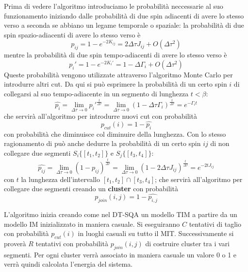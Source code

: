 Prima di vedere l'algoritmo introduciamo le probabilità neccessarie al suo funzionamento iniziando dalle probabilità di due spin adiacenti di avere lo stesso verso a seconda se abbiano un legame temporale o spaziale:
la probabilità di due spin spazio-adiacenti di avere lo stesso verso è
$$p_{ij} = 1 - e^{-2K_{ij}} = 2\Delta \tau J_{ij} + O(\Delta \tau^2)$$
mentre la probabilità di due spin tempo-adiacenti di avere lo stesso verso è
$$p_i' = 1 - e^{-2K_{i}'} = 1 - \Delta \Gamma_{i} + O(\Delta \tau^2)$$
Queste probabilità vengono utilizzate attraverso l'algoritmo Monte Carlo per introdurre altri cut.
Da qui si può esprimere la probabilità di un certo spin $i$ di collegarsi al suo tempo-adiacente in un segmento di lunghezza $t < \beta$:
$$\hat{p_i} = \lim_{\Delta \tau \to 0} p_i'^{\frac{t}{\Delta \tau}} = \lim_{\Delta \tau \to 0} (1 - \Delta \tau \Gamma_i)^\frac{t}{\Delta \tau} = e^{- \Gamma_i t}$$
che servirà all'algoritmo per introdurre nuovi cut con probabilità
$$p_{cut}(i) = 1 - \hat{p_i}$$
con probabilità che diminuisce col diminuire della lunghezza.
Con lo stesso ragionamento di può anche dedurre la probabilità di un certo spin $ij$ di non collegare due segmenti $S_i\{[t_1, t_2]\}$ e $S_j\{[t_3, t_4]\}$:
$$\hat{p_{ij}} = \lim_{\Delta \tau \to 0} (1 - p_{ij})^\frac{t}{\Delta \tau} = \lim_{\Delta \tau \to 0} (1 - 2\Delta \tau J_{ij})^\frac{t}{\Delta \tau} = e^{-2 t J_{ij}}$$
con $t$ la lunghezza dell'intervallo $[t_1, t_2] \cap [t_3, t_4]$; che servirà all'algoritmo per collegare due segmenti creando un \textbf{cluster} con probabilità
$$p_{join}(i,j) = 1 - \hat{p_{i,j}}$$

L'algoritmo inizia creando come nel DT-SQA un modello TIM a partire da un modello IM inizializzato in maniera casuale. Si eseguiranno $C$ tentativi di taglio con probabilità $p_{cut}(i)$ in luoghi casuali su tutto il MIT. Successivamente si proverà $R$ tentativi con probabilità $p_{join}(i,j)$ di costruire cluster tra i vari segmenti. Per ogni cluster verrà associato in maniera casuale un valore 0 o 1 e verrà quindi calcolata l'energia del sistema.


